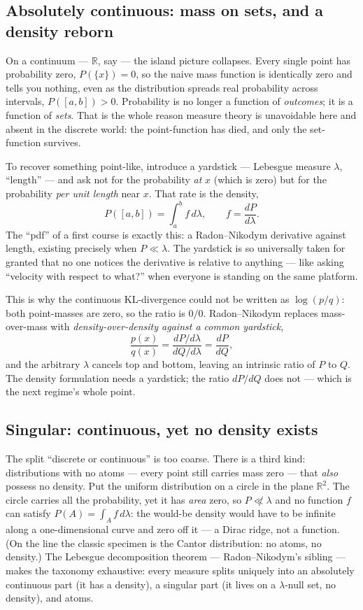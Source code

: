 \documentclass[11pt]{article}
\begin{document}
\subsection*{Absolutely continuous: mass on sets, and a density reborn}

On a continuum --- $\mathbb{R}$, say --- the island picture collapses. Every single point has
probability zero, $P(\{x\}) = 0$, so the naive mass function is identically zero and tells you
nothing, even as the distribution spreads real probability across intervals, $P([a,b]) > 0$.
Probability is no longer a function of \emph{outcomes}; it is a function of \emph{sets}. That
is the whole reason measure theory is unavoidable here and absent in the discrete world: the
point-function has died, and only the set-function survives.

To recover something point-like, introduce a yardstick --- Lebesgue measure $\lambda$,
``length'' --- and ask not for the probability \emph{at} $x$ (which is zero) but for the
probability \emph{per unit length} near $x$. That rate is the density,
\[
  P([a,b]) = \int_a^b f \, d\lambda, \qquad f = \frac{dP}{d\lambda}.
\]
The ``pdf'' of a first course is exactly this: a Radon--Nikodym derivative against length,
existing precisely when $P \ll \lambda$. The yardstick is so universally taken for granted
that no one notices the derivative is relative to anything --- like asking ``velocity with
respect to what?'' when everyone is standing on the same platform.

\begin{insight}
This is why the continuous KL-divergence could not be written as $\log(p/q)$: both
point-masses are zero, so the ratio is $0/0$. Radon--Nikodym replaces mass-over-mass with
\emph{density-over-density against a common yardstick},
\[
  \frac{p(x)}{q(x)} = \frac{dP/d\lambda}{dQ/d\lambda} = \frac{dP}{dQ},
\]
and the arbitrary $\lambda$ cancels top and bottom, leaving an intrinsic ratio of $P$ to $Q$.
The density formulation needs a yardstick; the ratio $dP/dQ$ does not --- which is the next
regime's whole point.
\end{insight}

\subsection*{Singular: continuous, yet no density exists}

The split ``discrete or continuous'' is too coarse. There is a third kind: distributions with
no atoms --- every point still carries mass zero --- that \emph{also} possess no density. Put
the uniform distribution on a circle in the plane $\mathbb{R}^2$. The circle carries all the
probability, yet it has \emph{area} zero, so $P \not\ll \lambda$ and no function $f$ can
satisfy $P(A) = \int_A f \, d\lambda$: the would-be density would have to be infinite along a
one-dimensional curve and zero off it --- a Dirac ridge, not a function. (On the line the
classic specimen is the Cantor distribution: no atoms, no density.) The Lebesgue decomposition
theorem --- Radon--Nikodym's sibling --- makes the taxonomy exhaustive: every measure splits
uniquely into an absolutely continuous part (it has a density), a singular part (it lives on a
$\lambda$-null set, no density), and atoms.
\end{document}
